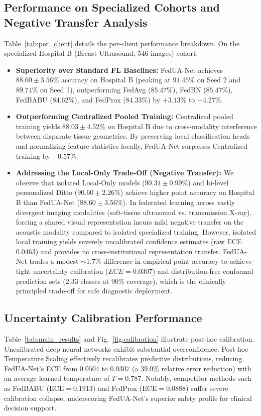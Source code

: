 \documentclass[journal]{IEEEtran}
\begin{document}
\subsection{Performance on Specialized Cohorts and Negative Transfer Analysis}
Table~\ref{tab:per_client} details the per-client performance breakdown. On the specialized Hospital B (Breast Ultrasound, $546$ images) cohort:
\begin{itemize}
    \item \textbf{Superiority over Standard FL Baselines:} FedUA-Net achieves \textbf{$88.60 \pm 3.56\%$} accuracy on Hospital B (peaking at $91.45\%$ on Seed 2 and $89.74\%$ on Seed 1), outperforming FedAvg ($85.47\%$), FedBN ($85.47\%$), FedBABU ($84.62\%$), and FedProx ($84.33\%$) by $+3.13\%$ to $+4.27\%$.
    \item \textbf{Outperforming Centralized Pooled Training:} Centralized pooled training yields $88.03 \pm 4.52\%$ on Hospital B due to cross-modality interference between disparate tissue geometries. By preserving local classification heads and normalizing feature statistics locally, FedUA-Net surpasses Centralized training by $+0.57\%$.
    \item \textbf{Addressing the Local-Only Trade-Off (Negative Transfer):} We observe that isolated Local-Only models ($90.31 \pm 0.99\%$) and bi-level personalized Ditto ($90.60 \pm 2.26\%$) achieve higher point accuracy on Hospital B than FedUA-Net ($88.60 \pm 3.56\%$). In federated learning across vastly divergent imaging modalities (soft-tissue ultrasound vs. transmission X-ray), forcing a shared visual representation incurs mild negative transfer on the acoustic modality compared to isolated specialized training. However, isolated local training yields severely uncalibrated confidence estimates (raw ECE $0.0463$) and provides no cross-institutional representation transfer. FedUA-Net trades a modest $\sim 1.7\%$ difference in empirical point accuracy to achieve tight uncertainty calibration ($ECE=0.0307$) and distribution-free conformal prediction sets ($2.33$ classes at $90\%$ coverage), which is the clinically principled trade-off for safe diagnostic deployment.
\end{itemize}

\subsection{Uncertainty Calibration Performance}
Table~\ref{tab:main_results} and Fig.~\ref{fig:calibration} illustrate post-hoc calibration. Uncalibrated deep neural networks exhibit substantial overconfidence. Post-hoc Temperature Scaling effectively recalibrates predictive distributions, reducing FedUA-Net's ECE from $0.0504$ to \textbf{$0.0307$} (a \textbf{$39.0\%$} relative error reduction) with an average learned temperature of $T=0.787$. Notably, competitor methods such as FedBABU ($\text{ECE} = 0.1913$) and FedProx ($\text{ECE} = 0.0888$) suffer severe calibration collapse, underscoring FedUA-Net's superior safety profile for clinical decision support.
\end{document}
